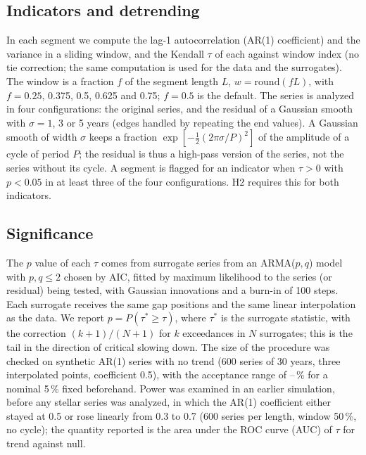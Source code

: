 \subsection{Indicators and detrending}

In each segment we compute the lag-1 autocorrelation (AR(1) coefficient) and the variance in a sliding window, and the Kendall $\tau$ of each against window index (no tie correction; the same computation is used for the data and the surrogates). The window is a fraction $f$ of the segment length $L$, $w = \mathrm{round}(fL)$, with $f = 0.25$, 0.375, 0.5, 0.625 and 0.75; $f = 0.5$ is the default. The series is analyzed in four configurations: the original series, and the residual of a Gaussian smooth with $\sigma = 1$, 3 or 5 years (edges handled by repeating the end values). A Gaussian smooth of width $\sigma$ keeps a fraction $\exp[-\tfrac{1}{2}(2\pi\sigma/P)^2]$ of the amplitude of a cycle of period $P$; the residual is thus a high-pass version of the series, not the series without its cycle. A segment is flagged for an indicator when $\tau > 0$ with $p < 0.05$ in at least three of the four configurations. H2 requires this for both indicators.

\subsection{Significance}

The $p$ value of each $\tau$ comes from \NSurr{} surrogate series from an ARMA($p,q$) model with $p,q \le 2$ chosen by AIC, fitted by maximum likelihood to the series (or residual) being tested, with Gaussian innovations and a burn-in of 100 steps. Each surrogate receives the same gap positions and the same linear interpolation as the data. We report $p = P(\tau^{*} \ge \tau)$, where $\tau^{*}$ is the surrogate statistic, with the correction $(k+1)/(N+1)$ for $k$ exceedances in $N$ surrogates; this is the tail in the direction of critical slowing down. The size of the procedure was checked on synthetic AR(1) series with no trend (600 series of 30 years, three interpolated points, coefficient 0.5), with the acceptance range of \SizeLo--\SizeHi\,\% for a nominal 5\,\% fixed beforehand. Power was examined in an earlier simulation, before any stellar series was analyzed, in which the AR(1) coefficient either stayed at 0.5 or rose linearly from 0.3 to 0.7 (600 series per length, window 50\,\%, no cycle); the quantity reported is the area under the ROC curve (AUC) of $\tau$ for trend against null.

